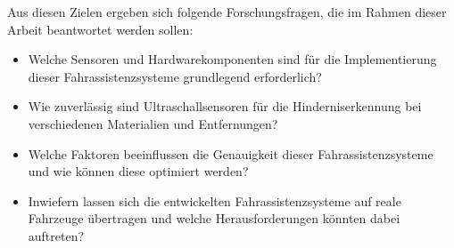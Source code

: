 Aus diesen Zielen ergeben sich folgende Forschungsfragen, die im Rahmen dieser Arbeit beantwortet werden sollen:
\begin{itemize}
    \item Welche Sensoren und Hardwarekomponenten sind für die Implementierung dieser Fahrassistenzsysteme grundlegend erforderlich?
    \item Wie zuverlässig sind Ultraschallsensoren für die Hinderniserkennung bei verschiedenen Materialien und Entfernungen?
    \item Welche Faktoren beeinflussen die Genauigkeit dieser Fahrassistenzsysteme und wie können diese optimiert werden?
    \item Inwiefern lassen sich die entwickelten Fahrassistenzsysteme auf reale Fahrzeuge übertragen und welche Herausforderungen könnten dabei auftreten?
\end{itemize}


